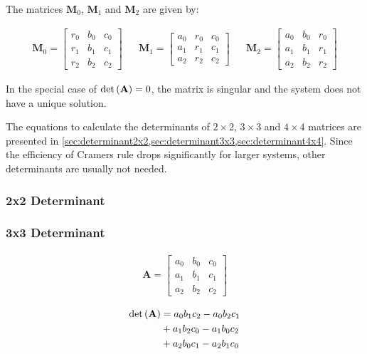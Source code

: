 The matrices $\mathbf{M}_0$, $\mathbf{M}_1$ and $\mathbf{M}_2$ are given by:

\begin{align*}
\mathbf{M}_0
=
\begin{bmatrix}
r_0&b_0&c_0\\
r_1&b_1&c_1\\
r_2&b_2&c_2
\end{bmatrix}
&&
\mathbf{M}_1
=
\begin{bmatrix}
a_0&r_0&c_0\\
a_1&r_1&c_1\\
a_2&r_2&c_2
\end{bmatrix}
&&
\mathbf{M}_2
=
\begin{bmatrix}
a_0&b_0&r_0\\
a_1&b_1&r_1\\
a_2&b_2&r_2
\end{bmatrix}
\end{align*}

In the special case of $\mathrm{det}\left(\mathbf{A}\right) = 0$, the matrix is singular and the system does not have a unique solution.

The equations to calculate the determinants of $2 \times 2$, $3 \times 3$ and $4 \times 4$ matrices are presented in \cref {sec:determinant2x2,sec:determinant3x3,sec:determinant4x4}.
Since the efficiency of Cramers rule drops significantly for larger systems, other determinants are usually not needed. 




\subsubsection{2x2 Determinant}
\label{sec:determinant2x2}

\subsubsection{3x3 Determinant}
\label{sec:determinant3x3}
\begin{align*}
\mathbf{A}
=
\begin{bmatrix}
a_0&b_0&c_0\\
a_1&b_1&c_1\\
a_2&b_2&c_2
\end{bmatrix}
\end{align*}

\begin{align*}
\mathrm{det}\left(\mathbf{A}\right)
&
= a_0b_1c_2 - a_0b_2c_1 
\\&
+ a_1b_2c_0 - a_1b_0c_2 
\\&
+ a_2b_0c_1 - a_2b_1c_0
\end{align*}

